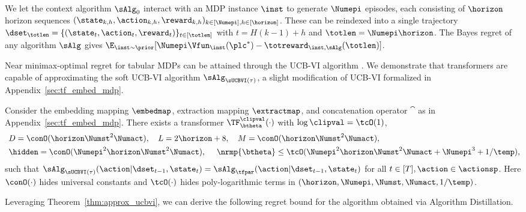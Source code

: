 \documentclass[10pt]{article}
\begin{document}
We let the context algorithm $\sAlg_0$ interact with an MDP instance $\inst$ to generate $\Numepi$ episodes, each consisting of $\horizon$ horizon sequences $ (\state_{k,h},\action_{k,h},\reward_{k,h})_{k \in [\Numepi], h \in [\horizon]}$. These can be reindexed into a single trajectory $\dset_{\totlen} = \{ (\state_t,\action_t,\reward_t) \}_{t \in [\totlen]}$ with $t=H(k-1)+h$ and $\totlen=\Numepi\horizon$. The Bayes regret of any algorithm $\sAlg$ gives $\E_{\inst\sim\prior}[\Numepi\Vfun_\inst(\plc^*)-\totreward_{\inst,\sAlg}(\totlen)]$.


Near minimax-optimal regret for tabular MDPs can be attained through the UCB-VI algorithm \citep{azar2017minimax}. We demonstrate that transformers are capable of approximating the soft UCB-VI algorithm $\sAlg_{\sUCBVI(\tau)}$, a slight modification of UCB-VI formalized in Appendix~\ref{sec:tf_embed_mdp}.



\begin{theorem}\label{thm:approx_ucbvi}
Consider the embedding mapping $\embedmap$, extraction mapping $\extractmap$, and concatenation operator $\cat$ as in Appendix~\ref{sec:tf_embed_mdp}. There exists a transformer $\TF_\btheta^{\clipval}(\cdot)$ with $\log \clipval = \tcO(1)$,
\begin{equation}\label{eq:ucbvi_tf_param-main}
\begin{aligned}
&~D =\conO(\horizon\Numst^2\Numact),~~~L= 2\horizon+8,~~~M= \conO(\horizon\Numst^2\Numact),\\
&~\hidden= \conO(\Numepi^2\horizon\Numst^2\Numact),~~~~\nrmp{\btheta}\leq \tcO(\Numepi^2\horizon\Numst^2\Numact+\Numepi^3+1/\temp),
\end{aligned}
\end{equation}
such that
$\sAlg_{\sUCBVI(\tau)}(\action|\dset_{t-1},\state_t) = \sAlg_{\tfpar}(\action|\dset_{t-1},\state_t)$ for all $t\in[T],\action\in\actionsp$. Here $\conO(\cdot)$ hides universal constants and $\tcO(\cdot)$  hides poly-logarithmic terms in $(\horizon,\Numepi,\Numst,\Numact,1/\temp)$.
\end{theorem}

Leveraging Theorem~\ref{thm:approx_ucbvi}, we can derive the following regret bound for the algorithm obtained via Algorithm Distillation.
\end{document}
